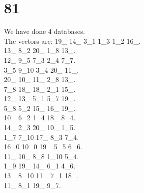 \chapter{81}
\indent We have done 4 databases.\\
The vectors are:
19\_ 14\_ 3\_1 1\_3 1\_2 16\_.\\13\_ 8\_2 20\_ 1\_8 13\_.\\12\_ 9\_5 7\_3 2\_4 7\_7.\\3\_5 9\_10 3\_4 20\_ 11\_.\\20\_ 10\_ 11\_ 2\_8 13\_.\\7\_8 18\_ 18\_ 2\_1 15\_.\\12\_ 13\_ 5\_1 5\_7 19\_.\\5\_8 5\_2 15\_ 16\_ 19\_.\\10\_ 6\_2 1\_4 18\_ 8\_4.\\14\_ 2\_3 20\_ 10\_ 1\_5.\\1\_7 7\_10 17\_ 8\_3 7\_4.\\16\_0 10\_0 19\_ 5\_5 6\_6.\\11\_ 10\_ 8\_8 1\_10 5\_4.\\1\_9 19\_ 14\_ 6\_1 4\_6.\\13\_ 8\_10 11\_ 7\_1 18\_.\\11\_ 8\_1 19\_ 9\_7.\\